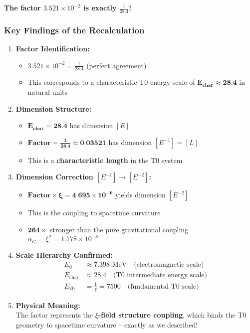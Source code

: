 \documentclass[11pt,a4paper]{article}
\begin{document}
	\textbf{The factor $3{.}521 \times 10^{-2}$ is exactly $\frac{1}{28{.}4}$!}
	\subsubsection{Key Findings of the Recalculation}
	
	\begin{enumerate}
		\item \textbf{Factor Identification:}
		\begin{itemize}
			\item $3{.}521 \times 10^{-2} = \frac{1}{28{.}4}$ (perfect agreement)
			\item This corresponds to a characteristic T0 energy scale of $\mathbf{E_{\text{char}} \approx 28{.}4}$ in natural units
		\end{itemize}
		
		\item \textbf{Dimension Structure:}
		\begin{itemize}
			\item $\mathbf{E_{\text{char}} = 28{.}4}$ has dimension $[E]$
			\item $\mathbf{\text{Factor} = \frac{1}{28{.}4} \approx 0{.}03521}$ has dimension $[E^{-1}] = [L]$
			\item This is a \textbf{characteristic length} in the T0 system
		\end{itemize}
		
		\item \textbf{Dimension Correction $[E^{-1}] \rightarrow [E^{-2}]$:}
		\begin{itemize}
			\item $\mathbf{\text{Factor} \times \xi = 4{.}695 \times 10^{-6}}$ yields dimension $[E^{-2}]$
			\item This is the coupling to spacetime curvature
			\item $\mathbf{264\times}$ stronger than the pure gravitational coupling $\alpha_G = \xi^2 = 1{.}778 \times 10^{-8}$
		\end{itemize}
		
		\item \textbf{Scale Hierarchy Confirmed:}
		\begin{align}
			E_0 &\approx 7{.}398 \text{ MeV} \quad \text{(electromagnetic scale)} \\
			E_{\text{char}} &\approx 28{.}4 \quad \text{(T0 intermediate energy scale)} \\
			E_{T0} &= \frac{1}{\xi} = 7500 \quad \text{(fundamental T0 scale)}
		\end{align}
		
		\item \textbf{Physical Meaning:}
		\\The factor represents the \textbf{$\xi$-field structure coupling}, which binds the T0 geometry to spacetime curvature -- exactly as we described!
	\end{enumerate}
	
\end{document}
